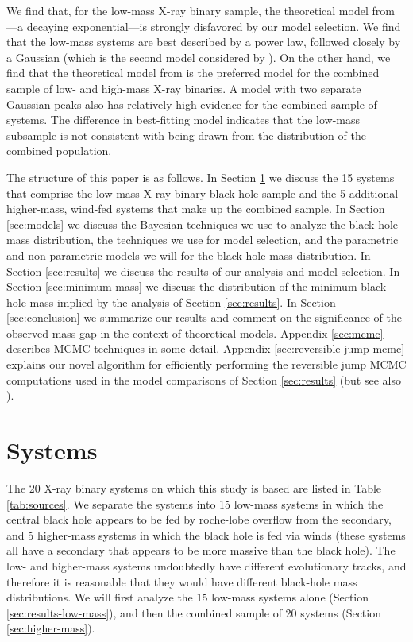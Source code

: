 \documentclass[preprint]{aastex}
\begin{document}
We find that, for the low-mass X-ray binary sample, the theoretical
model from \citet{Fryer2001}---a decaying exponential---is strongly
disfavored by our model selection.  We find that the low-mass systems
are best described by a power law, followed closely by a Gaussian
(which is the second model considered by \citet{Ozel2010}).  On the
other hand, we find that the theoretical model from \citet{Fryer2001}
is the preferred model for the combined sample of low- and high-mass
X-ray binaries.  A model with two separate Gaussian peaks also has
relatively high evidence for the combined sample of systems.  The
difference in best-fitting model indicates that the low-mass subsample
is not consistent with being drawn from the distribution of the
combined population.

The structure of this paper is as follows.  In Section
\ref{sec:systems} we discuss the 15 systems that comprise the low-mass
X-ray binary black hole sample and the 5 additional higher-mass,
wind-fed systems that make up the combined sample.  In Section
\ref{sec:models} we discuss the Bayesian techniques we use to analyze
the black hole mass distribution, the techniques we use for model
selection, and the parametric and non-parametric models we will for
the black hole mass distribution.  In Section \ref{sec:results} we
discuss the results of our analysis and model selection.  In Section
\ref{sec:minimum-mass} we discuss the distribution of the minimum
black hole mass implied by the analysis of Section \ref{sec:results}.
In Section \ref{sec:conclusion} we summarize our results and comment
on the significance of the observed mass gap in the context of
theoretical models.  Appendix \ref{sec:mcmc} describes MCMC techniques
in some detail.  Appendix \ref{sec:reversible-jump-mcmc} explains our
novel algorithm for efficiently performing the reversible jump MCMC
computations used in the model comparisons of Section
\ref{sec:results} (but see also \citet{Farr2010}).

\section{Systems}
\label{sec:systems}

The 20 X-ray binary systems on which this study is based are listed in
Table \ref{tab:sources}.  We separate the systems into 15 low-mass
systems in which the central black hole appears to be fed by
roche-lobe overflow from the secondary, and 5 higher-mass systems in
which the black hole is fed via winds (these systems all have a
secondary that appears to be more massive than the black hole).  The
low- and higher-mass systems undoubtedly have different evolutionary
tracks, and therefore it is reasonable that they would have different
black-hole mass distributions.  We will first analyze the 15 low-mass
systems alone (Section \ref{sec:results-low-mass}), and then the
combined sample of 20 systems (Section \ref{sec:higher-mass}).
\end{document}
